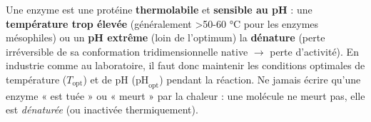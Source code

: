\documentclass[11pt]{article}
\begin{document}
\begin{attention}
Une enzyme est une protéine \textbf{thermolabile} et \textbf{sensible au pH} : une \textbf{température trop élevée} (généralement \textgreater 50-60 °C pour les enzymes mésophiles) ou un \textbf{pH extrême} (loin de l'optimum) la \textbf{dénature} (perte irréversible de sa conformation tridimensionnelle native $\rightarrow$ perte d'activité). En industrie comme au laboratoire, il faut donc maintenir les conditions optimales de température ($T_{\text{opt}}$) et de pH ($\text{pH}_{\text{opt}}$) pendant la réaction. Ne jamais écrire qu'une enzyme « est tuée » ou « meurt » par la chaleur : une molécule ne meurt pas, elle est \emph{dénaturée} (ou inactivée thermiquement).
\end{attention}
\end{document}
